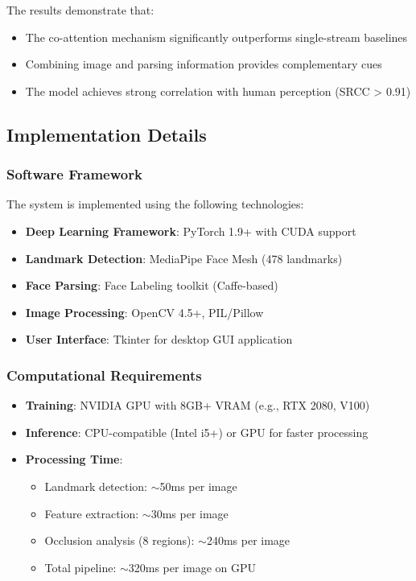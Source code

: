 The results demonstrate that:
\begin{itemize}
    \item The co-attention mechanism significantly outperforms single-stream baselines
    \item Combining image and parsing information provides complementary cues
    \item The model achieves strong correlation with human perception (SRCC > 0.91)
\end{itemize}

\subsection{Implementation Details}

\subsubsection{Software Framework}

The system is implemented using the following technologies:
\begin{itemize}
    \item \textbf{Deep Learning Framework}: PyTorch 1.9+ with CUDA support
    \item \textbf{Landmark Detection}: MediaPipe Face Mesh (478 landmarks)
    \item \textbf{Face Parsing}: Face Labeling toolkit (Caffe-based)
    \item \textbf{Image Processing}: OpenCV 4.5+, PIL/Pillow
    \item \textbf{User Interface}: Tkinter for desktop GUI application
\end{itemize}

\subsubsection{Computational Requirements}

\begin{itemize}
    \item \textbf{Training}: NVIDIA GPU with 8GB+ VRAM (e.g., RTX 2080, V100)
    \item \textbf{Inference}: CPU-compatible (Intel i5+) or GPU for faster processing
    \item \textbf{Processing Time}: 
    \begin{itemize}
        \item Landmark detection: $\sim$50ms per image
        \item Feature extraction: $\sim$30ms per image
        \item Occlusion analysis (8 regions): $\sim$240ms per image
        \item Total pipeline: $\sim$320ms per image on GPU
    \end{itemize}
\end{itemize}

